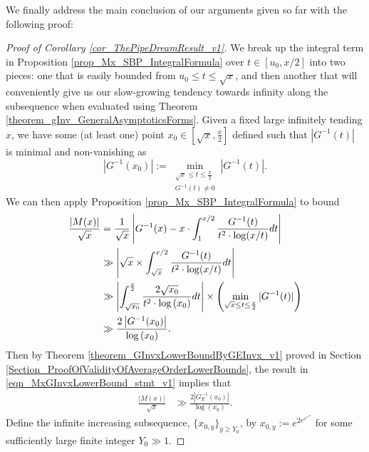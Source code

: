 \documentclass[11pt,reqno,a4letter]{article}
\numberwithin{figure}{section}
\numberwithin{table}{section}
\theoremstyle{plain}
\numberwithin{theorem}{section}
\theoremstyle{definition}
\begin{document}
We finally address the main conclusion of our arguments given so far with the 
following proof: 

\begin{proof}[Proof of Corollary \ref{cor_ThePipeDreamResult_v1}] 
\label{proofOf_cor_ThePipeDreamResult_v1} 
We break up the integral term in 
Proposition \ref{prop_Mx_SBP_IntegralFormula} 
over $t \in [u_0, x/2]$ into two pieces: one that is easily bounded 
from $u_0 \leq t \leq \sqrt{x}$, 
and then another that will conveniently give us our slow-growing tendency towards 
infinity along the subsequence when evaluated using 
Theorem \ref{theorem_gInv_GeneralAsymptoticsForms}. 
Given a fixed large infinitely tending $x$, we have some (at least one) point 
$x_0 \in \left[\sqrt{x}, \frac{x}{2}\right]$ defined such that 
$|G^{-1}(t)|$ is minimal and non-vanishing as 
\[
\left\lvert G^{-1}(x_0) \right\rvert := 
     \min_{\substack{\sqrt{x} \leq t \leq \frac{x}{2} \\ G^{-1}(t) \neq 0}} |G^{-1}(t)|. 
\]
We can then apply Proposition \ref{prop_Mx_SBP_IntegralFormula} to bound 
\begin{align} 
\notag 
\frac{|M(x)|}{\sqrt{x}} & = 
     \frac{1}{\sqrt{x}} \left\lvert G^{-1}(x) - x \cdot \int_1^{x/2} \frac{G^{-1}(t)}{ 
     t^2 \cdot \log(x/t)} dt \right\rvert \\ 
\notag 
     & \gg 
     \left\lvert \sqrt{x} \times \int_{\sqrt{x}}^{x/2} \frac{G^{-1}(t)}{ 
     t^2 \cdot \log(x/t)} dt \right\rvert \\ 
\notag 
     & \gg \left\lvert \int_{\sqrt{x_0}}^{\frac{x}{2}} \frac{2 \sqrt{x_0}}{ 
     t^2 \cdot \log\left(x_0\right)} dt \right\rvert 
     \times \left( 
     \min_{\sqrt{x} \leq t \leq \frac{x}{2}} |G^{-1}(t)| 
     \right) \\ 
\label{eqn_MxGInvxLowerBound_stmt_v1} 
     & \gg  
     \frac{2 \left\lvert G^{-1}(x_0) \right\rvert}{\log\left(x_0\right)}. 
\end{align} 
Then by Theorem \ref{theorem_GInvxLowerBoundByGEInvx_v1} proved in 
Section \ref{Section_ProofOfValidityOfAverageOrderLowerBounds}, the result in 
\eqref{eqn_MxGInvxLowerBound_stmt_v1} implies that 
\begin{align} 
\label{eqn_MxGInvxLowerBound_stmt_v2} 
\frac{|M(x)|}{\sqrt{x}} & \gg \frac{2 \left\lvert G_{E}^{-1}(x_0) \right\rvert}{\log\left(x_0\right)}. 
\end{align} 
Define the infinite increasing subsequence, 
$\{x_{0,y}\}_{y \geq Y_0}$, by $x_{0,y} := e^{2e^{e^{e^{e^{2y}}}}}$ for some sufficiently 
large finite integer $Y_0 \gg 1$. 

\end{proof}
\end{document}
